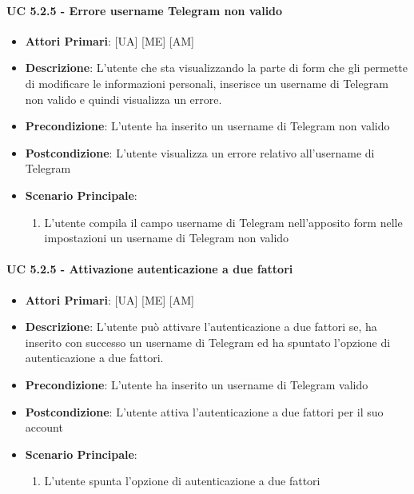 			\paragraph{UC 5.2.5 - Errore username Telegram non valido}
			\begin{itemize}
				\item \textbf{Attori Primari}: [UA] [ME] [AM]
				\item \textbf{Descrizione}: L'utente che sta visualizzando la parte di form che gli permette di modificare le informazioni personali, inserisce un username di Telegram non valido e quindi visualizza un errore. 
				\item \textbf{Precondizione}: L'utente ha inserito un username di Telegram non valido
				\item \textbf{Postcondizione}: L'utente visualizza un errore relativo all'username di Telegram
				\item \textbf{Scenario Principale}:
				\begin{enumerate}
					\item{L'utente compila il campo username di Telegram nell'apposito form nelle impostazioni un username di Telegram non valido}
				\end{enumerate}	
			\end{itemize}

			\paragraph{UC 5.2.5 - Attivazione autenticazione a due fattori}
			\begin{itemize}
				\item \textbf{Attori Primari}: [UA] [ME] [AM]
				\item \textbf{Descrizione}: L'utente può attivare l'autenticazione a due fattori se, ha inserito con successo un username di Telegram ed ha spuntato l'opzione di autenticazione a due fattori.
				\item \textbf{Precondizione}: L'utente ha inserito un username di Telegram valido 
				\item \textbf{Postcondizione}: L'utente attiva l'autenticazione a due fattori per il suo account
				\item \textbf{Scenario Principale}:
				\begin{enumerate}
					\item{L'utente spunta l'opzione di autenticazione a due fattori}
				\end{enumerate}	
			\end{itemize}


